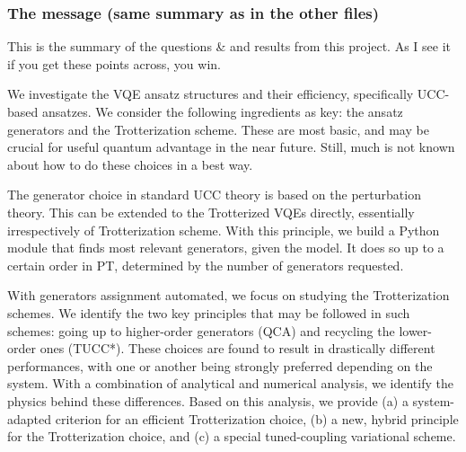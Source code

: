 \documentclass[10pt, a4paper]{article}
\begin{document}
\subsubsection*{The message (same summary as in the other files)}

This is the summary of the questions \& and results from this project. As I see it if you get these points across, you win.

We investigate the VQE ansatz structures and their efficiency, specifically UCC-based ansatzes. We consider the following ingredients as key: the ansatz generators and the Trotterization scheme. These are most basic, and may be crucial for useful quantum advantage in the near future. Still, much is not known about how to do these choices in a best way.

The generator choice in standard UCC theory is based on the perturbation theory. This can be extended to the Trotterized VQEs directly, essentially irrespectively of Trotterization scheme. With this principle, we build a Python module that finds most relevant generators, given the model. It does so up to a certain order in PT, determined by the number of generators requested.

With generators assignment automated, we focus on studying the Trotterization schemes. We identify the two key principles that may be followed in such schemes: going up to higher-order generators (QCA) and recycling the lower-order ones (TUCC*). These choices are found to result in drastically different performances, with one or another being strongly preferred depending on the system. With a combination of analytical and numerical analysis, we identify the physics behind these differences. Based on this analysis, we provide (a) a system-adapted criterion for an efficient Trotterization choice, (b) a new, hybrid principle for the Trotterization choice, and (c) a special tuned-coupling variational scheme.
\end{document}
